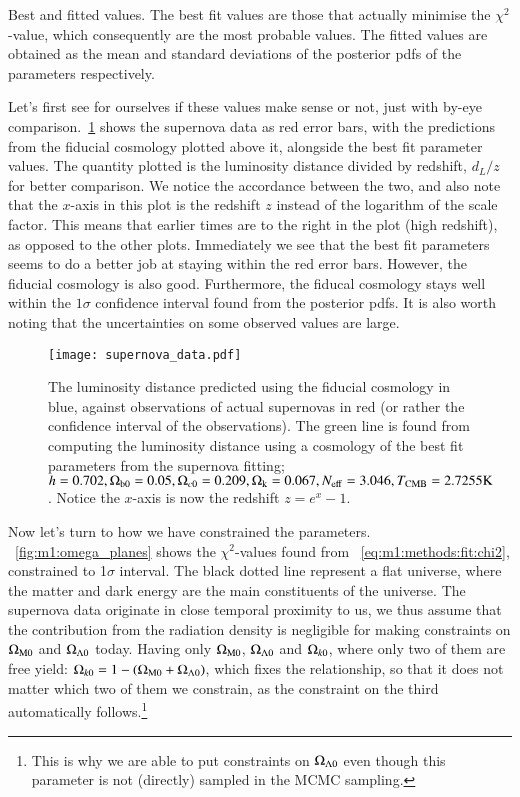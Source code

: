     \begin{table}
        
        \caption{Best and fitted values. The best fit values are those that actually minimise the $\chi^2$-value, which consequently are the most probable values. The fitted values are obtained as the mean and standard deviations of the posterior pdfs of the parameters respectively. }
        \label{tab:m1:best_fit_values}
    \end{table}
    Let's first see for ourselves if these values make sense or not, just with by-eye comparison.~\cref{fig:m1:supernova_data} shows the supernova data as red error bars, with the predictions from the fiducial cosmology plotted above it, alongside the best fit parameter values. The quantity plotted is the luminosity distance divided by redshift, $d_L/z$ for better comparison. We notice the accordance between the two, and also note that the $x$-axis in this plot is the redshift $z$ instead of the logarithm of the scale factor. This means that earlier times are to the right in the plot (high redshift), as opposed to the other plots. Immediately we see that the best fit parameters seems to do a better job at staying within the red error bars. However, the fiducial cosmology is also good. Furthermore, the fiducal cosmology stays well within the $1\sigma$ confidence interval found from the posterior pdfs. It is also worth noting that the uncertainties on some observed values are large. 

    \begin{figure}
        \texttt{[image: supernova\_data.pdf]}
        \caption{The luminosity distance predicted using the fiducial cosmology in blue, against observations of actual supernovas in red (or rather the confidence interval of the observations). The green line is found from computing the luminosity distance using a cosmology of the best fit parameters from the supernova fitting; $h=0.702, \Omega_\mathrm{b0} = 0.05, \Omega_{c0} = 0.209, \Omega_\mathrm{k}=0.067, N_\mathrm{eff}=3.046, T_\mathrm{CMB}=2.7255 \text{K}$. Notice the $x$-axis is now the redshift $z=e^x-1$.}
        \label{fig:m1:supernova_data}
    \end{figure}

    Now let's turn to how we have constrained the parameters. ~\cref{fig:m1:omega_planes} shows the $\chi^2$-values found from ~\cref{eq:m1:methods:fit:chi2}, constrained to 1$\sigma$ interval. The black dotted line represent a flat universe, where the matter and dark energy are the main constituents of the universe. The supernova data originate in close temporal proximity to us, we thus assume that the contribution from the radiation density is negligible for making constraints on $\Omega_\mathrm{M0}$ and $\Omega_{\Lambda0}$ today. Having only $\Omega_\mathrm{M0}$, $\Omega_{\Lambda0}$ and $\Omega_{k0}$, where only two of them are free yield: $\Omega_{k0}=1-(\Omega_\mathrm{M0}+\Omega_{\Lambda0})$, which fixes the relationship, so that it does not matter which two of them we constrain, as the constraint on the third automatically follows.\footnote{This is why we are able to put constraints on $\Omega_{\Lambda0}$ even though this parameter is not (directly) sampled in the MCMC sampling.}
    
